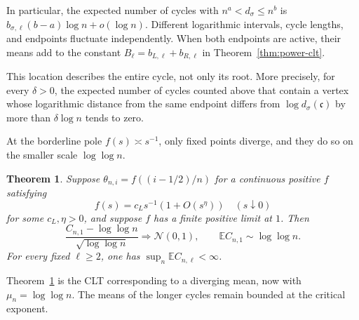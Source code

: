 \documentclass[11pt]{article}
\newtheorem{theorem}{Theorem}[section]
\theoremstyle{remark}
\theoremstyle{plain}
\newcommand{\E}{\mathbb E}
\begin{document}
In particular, the expected number of cycles with
$n^a<d_\sigma\le n^b$ is
$b_{\sigma,\ell}(b-a)\log n+o(\log n)$.  Different logarithmic intervals,
cycle lengths, and endpoints fluctuate independently.  When both endpoints
are active, their means add to the constant
$B_\ell=b_{L,\ell}+b_{R,\ell}$ in Theorem~\ref{thm:power-clt}.

This location describes the entire cycle, not only its root.  More precisely,
for every $\delta>0$, the expected number of cycles counted above that contain
a vertex whose logarithmic distance from the same endpoint differs from
$\log d_\sigma(\mathfrak c)$ by more than $\delta\log n$ tends to zero.

At the borderline pole $f(s)\asymp s^{-1}$, only fixed points diverge, and
they do so on the smaller scale $\log\log n$.

\begin{theorem}
\label{thm:critical-pole}
Suppose $\theta_{n,i}=f((i-1/2)/n)$ for a continuous positive $f$ satisfying
\[
 f(s)=c_Ls^{-1}(1+O(s^\eta))
 \quad(s\downarrow0)
\]
for some $c_L,\eta>0$, and suppose $f$ has a finite positive limit at $1$.
Then
\begin{equation}\label{eq:critical-fixed-clt}
 \frac{C_{n,1}-\log\log n}{\sqrt{\log\log n}}
 \Longrightarrow\mathcal N(0,1),
 \qquad
 \E C_{n,1}\sim\log\log n.
\end{equation}
For every fixed $\ell\ge2$, one has $\sup_n\E C_{n,\ell}<\infty$.
\end{theorem}

Theorem~\ref{thm:critical-pole} is the CLT corresponding to a diverging mean,
now with $\mu_n=\log\log n$.  The means of the longer cycles remain bounded
at the critical exponent.
\end{document}
